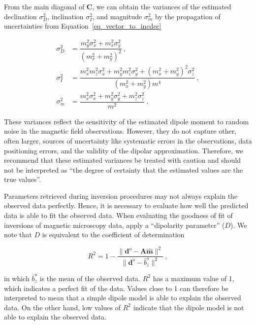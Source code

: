 \noindent
From the main diagonal of $\mathbf{C}$, we can obtain the variances of the
estimated declination $\sigma_D^2$, inclination $\sigma_I^2$, and magnitude $\sigma_m^2$
by the propagation of uncertainties from Equation~\ref{eq_vector_to_incdec}

\begin{equation}
\label{eq_variances}
\begin{aligned}
\sigma_D^2 &= \dfrac{m_y^2\sigma_x^2 + m_x^2\sigma_y^2}{\left(m_x^2 + m_y^2\right)^2} \ , \\
\sigma_I^2 &= \dfrac{m_x^2 m_z^2 \sigma_x^2 + m_y^2 m_z^2 \sigma_y^2 + \left(m_x^2 + m_y^2\right)^2\sigma_z^2}{\left(m_x^2 + m_y^2\right) m^4} \ , \\
\sigma_m^2 &= \dfrac{m_x^2\sigma_x^2 + m_y^2\sigma_y^2 + m_z^2\sigma_z^2}{m^2} \ .
\end{aligned}
\end{equation}

\noindent
These variances reflect the sensitivity of the estimated dipole moment to random noise in the magnetic field observations. However, they do not capture other, often larger, sources of uncertainty like systematic errors in the observations, data positioning errors, and the validity of the dipolar approximation. Therefore, we recommend that these estimated variances be treated with caution and should not be interpreted as ``the degree of certainty that the estimated values are the true values''.

Parameters retrieved during inversion procedures may not always explain the observed data perfectly.
Hence, it is necessary to evaluate how well the predicted data is able to fit the observed data.
When evaluating the goodness of fit of inversions of magnetic microscopy data, \citet{Fu2020} apply a ``dipolarity parameter'' ($D$).
We note that $D$ is equivalent to the coefficient of determination

\begin{equation}
\label{eq_r2}
R^2 = 1 - \dfrac{\|\mathbf{d}^o - \mathbf{A}\hat{\mathbf{m}}\|^2}{\|\mathbf{d}^o - \bar{b}_z^o\|^2}\ ,
\end{equation}

\noindent
in which $\bar{b}_z^o$ is the mean of the observed data.
$R^2$ has a maximum value of 1, which indicates a perfect fit of the data.
Values close to 1 can therefore be interpreted to mean that a simple dipole model is able to explain the observed data.
On the other hand, low values of $R^2$ indicate that the dipole model is not able to explain the observed data.

